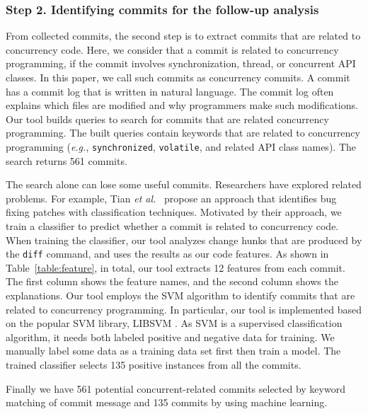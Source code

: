 \subsubsection{Step 2. Identifying commits for the follow-up analysis} From collected commits, the second step is to extract commits that are related to concurrency code. Here, we consider that a commit is related to concurrency programming, if the commit involves synchronization, thread, or concurrent API classes. In this paper, we call such commits as concurrency commits. A commit has a commit log that is written in natural language. The commit log often explains which files are modified and why programmers make such modifications. Our tool builds queries to search for commits that are related concurrency programming. The built queries contain keywords that are related to concurrency programming (\emph{e.g.}, \texttt{synchronized}, \texttt{volatile}, and related API class names). The search returns 561 commits.

The search alone can lose some useful commits. Researchers have explored related problems. For example, Tian \emph{et al.}~\cite{conf/icse/TianLL12} propose an approach that identifies bug fixing patches with classification techniques. Motivated by their approach, we train a classifier to predict whether a commit is related to concurrency code. When training the classifier, our tool analyzes change hunks that are produced by the \texttt{diff} command, and uses the results as our code features. As shown in Table~\ref{table:feature}, in total, our tool extracts 12 features from each commit. The first column shows the feature names, and the second column shows the explanations.
Our tool employs the SVM \cite{journals/ml/CortesV95} algorithm to identify commits that are related to concurrency programming. In particular, our tool is implemented based on the popular SVM library, LIBSVM \cite{libsvm}. As SVM is a supervised classification algorithm, it needs both labeled positive and negative data for training. We manually label some data as a training data set first then train a model. The trained classifier selects 135 positive instances from all the commits.


Finally we have 561 potential concurrent-related commits selected by keyword matching of commit message and 135 commits by using machine learning.


